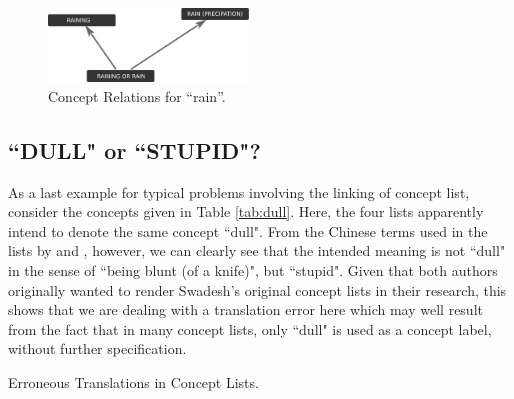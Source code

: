 \documentclass[10pt, a4paper]{article}
\begin{document}
  \begin{figure}[h]
  \includegraphics[width=0.475\textwidth]{img/rain.pdf}
  \caption{Concept Relations for ``rain''.}
  \label{fig:rain}
\end{figure}

\subsection{``DULL" or ``STUPID"?}
\noindent As a last example for typical problems involving the linking of concept list, consider the
concepts given in Table \ref{tab:dull}. Here, the four lists apparently intend to denote the same
concept ``dull". From the Chinese terms used in the lists by  and
, however, we can clearly see that the intended meaning is not ``dull" in the
sense of ``being blunt (of a knife)", but ``stupid". Given that both authors originally wanted to
render Swadesh's original concept lists in their research, this shows that we are dealing with a
translation error here which may well result from the fact that in many concept lists, only ``dull"
is used as a concept label, without further specification. 
 
\begin{table}[h]
    \caption{Erroneous Translations in Concept Lists.}
    \label{tab:dull}
  \end{table}
\end{document}
